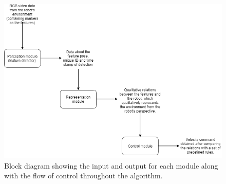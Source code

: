 \begin{figure}[h!]
	\centering
	\includegraphics[scale = 0.5]{"images/block diag"}
	\caption{Block diagram showing the input and output for each module along with the flow of control throughout the algorithm.}
	\label{fig:block-diag}
\end{figure}

